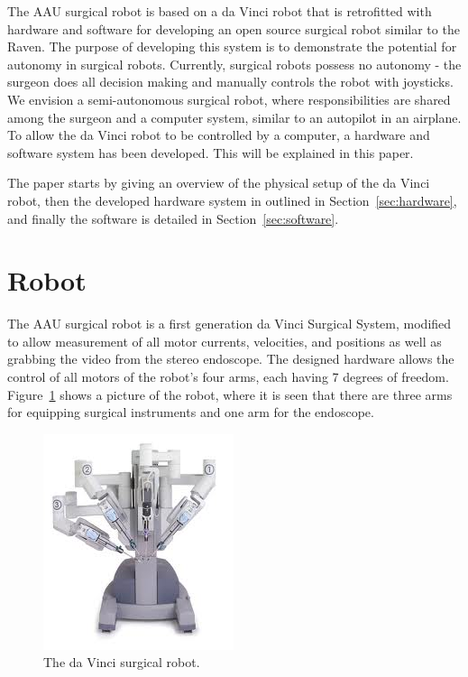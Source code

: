 \documentclass[a4paper, 11 pt, conference]{IEEEtran}  %
\begin{document}


The AAU surgical robot is based on a da Vinci robot that is retrofitted with hardware and software for developing an open source surgical robot similar to the Raven. The purpose of developing this system is to demonstrate the potential for autonomy in surgical robots. Currently, surgical robots possess no autonomy - the surgeon does all decision making and manually controls the robot with joysticks. We envision a semi-autonomous surgical robot, where responsibilities are shared among the surgeon and a computer system, similar to an autopilot in an airplane. To allow the da Vinci robot to be controlled by a computer, a hardware and software system has been developed. This will be explained in this paper.

The paper starts by giving an overview of the physical setup of the da Vinci robot, then the developed hardware system in outlined in Section~\ref{sec:hardware}, and finally the software is detailed in Section~\ref{sec:software}.

\section{Robot}
The AAU surgical robot is a first generation da Vinci Surgical System, modified to allow measurement of all motor currents, velocities, and positions as well as grabbing the video from the stereo endoscope. The designed hardware allows the control of all motors of the robot's four arms, each having 7 degrees of freedom. Figure~\ref{fig:robot} shows a picture of the robot, where it is seen that there are three arms for equipping surgical instruments and one arm for the endoscope.

\begin{figure}
    \centering
       \includegraphics[width=0.5\linewidth]{robot.png}
    \caption{The da Vinci surgical robot. \label{fig:robot}}
\end{figure}
\end{document}
